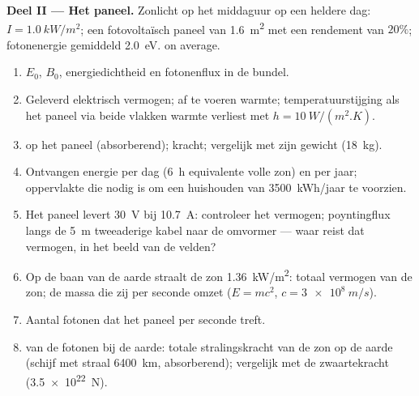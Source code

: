 \begin{problem}
\medskip
\noindent\textbf{Deel II --- Het paneel.}
Zonlicht op het middaguur op een heldere dag: $I = \qty{1.0}{kW/m^2}$; een
fotovoltaïsch paneel van \qty{1.6}{m^2} met een rendement van $20\%$;
fotonenergie gemiddeld \qty{2.0}{eV}.
on average.
\begin{enumerate}[resume]
  \item $E_0$, $B_0$, energiedichtheid en fotonenflux in de bundel.
  \item Geleverd elektrisch vermogen; af te voeren warmte;
        temperatuurstijging als het paneel via beide vlakken warmte verliest
        met $h = \qty{10}{W/(m^2.K)}$.
  \item {} op het paneel (absorberend); kracht; vergelijk met
        zijn gewicht (\qty{18}{kg}).
  \item Ontvangen energie per dag (\qty{6}{h} equivalente volle zon) en per
        jaar; oppervlakte die nodig is om een huishouden van
        \qty{3500}{kWh/jaar} te voorzien.
  \item Het paneel levert \qty{30}{V} bij \qty{10.7}{A}: controleer het
        vermogen; poyntingflux langs de \qty{5}{m} tweeaderige kabel naar de
        omvormer --- waar reist dat vermogen, in het beeld van de velden?
  \item Op de baan van de aarde straalt de zon \qty{1.36}{kW/m^2}: totaal
        vermogen van de zon; de massa die zij per seconde omzet ($E = mc^2$,
        $c = \qty{3e8}{m/s}$).
  \item Aantal fotonen dat het paneel per seconde treft.
  \item {} van de fotonen bij de aarde: totale stralingskracht van
        de zon op de aarde (schijf met straal \qty{6400}{km}, absorberend);
        vergelijk met de zwaartekracht (\qty{3.5e22}{N}).
\end{enumerate}


\end{problem}
